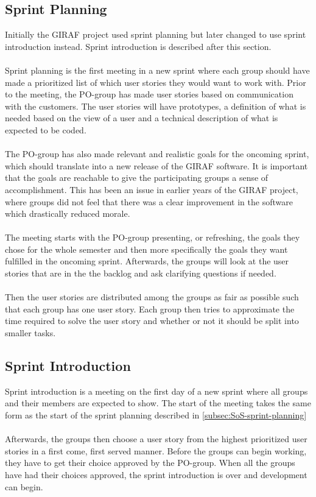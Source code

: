 \subsection{Sprint Planning} \label{subsec:SoS-sprint-planning}
Initially the GIRAF project used sprint planning but later changed to use sprint introduction instead.
Sprint introduction is described after this section.
\\
\\
Sprint planning is the first meeting in a new sprint where each group should have made a prioritized list of which user stories they would want to work with.
Prior to the meeting, the PO-group has made user stories based on communication with the customers.
The user stories will have prototypes, a definition of what is needed based on the view of a user and a technical description of what is expected to be coded.
\\
\\
The PO-group has also made relevant and realistic goals for the oncoming sprint, which should translate into a new release of the GIRAF software.
It is important that the goals are reachable to give the participating groups a sense of accomplishment.
This has been an issue in earlier years of the GIRAF project, where groups did not feel that there was a clear improvement in the software which drastically reduced morale.
\\
\\
The meeting starts with the PO-group presenting, or refreshing, the goals they chose for the whole semester and then more specifically the goals they want fulfilled in the oncoming sprint.
Afterwards, the groups will look at the user stories that are in the the backlog and ask clarifying questions if needed.
\\
\\
Then the user stories are distributed among the groups as fair as possible such that each group has one user story.
Each group then tries to approximate the time required to solve the user story and whether or not it should be split into smaller tasks.

\subsection{Sprint Introduction} \label{subsec:SoS-sprint-introduction}
Sprint introduction is a meeting on the first day of a new sprint where all groups and their members are expected to show. 
The start of the meeting takes the same form as the start of the sprint planning described in \autoref{subsec:SoS-sprint-planning}
\\
\\
Afterwards, the groups then choose a user story from the highest prioritized user stories in a first come, first served manner.
Before the groups can begin working, they have to get their choice approved by the PO-group.
When all the groups have had their choices approved, the sprint introduction is over and development can begin.

